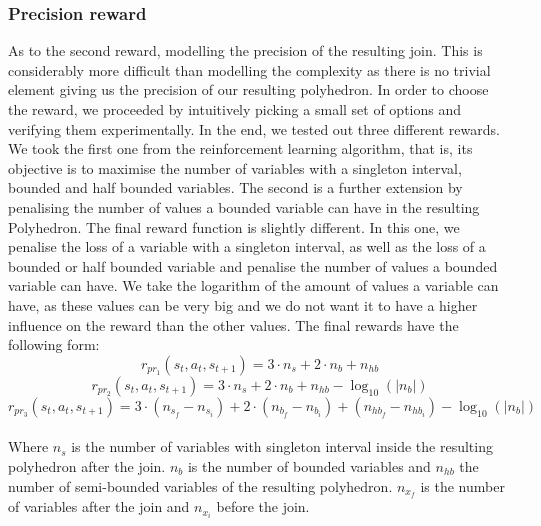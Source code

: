 \subsubsection{Precision reward}
As to the second reward, modelling the precision of the resulting join. This is considerably more difficult than modelling the complexity as there is no trivial element giving us the precision of our resulting polyhedron. In order to choose the reward, we proceeded by intuitively picking a small set of options and verifying them experimentally. In the end, we tested out three different rewards.\\
We took the first one from the reinforcement learning algorithm, that is, its objective is to maximise the number of variables with a singleton interval, bounded and half bounded variables. The second is a further extension by penalising the number of values a bounded variable can have in the resulting Polyhedron. The final reward function is slightly different. In this one, we penalise the loss of a variable with a singleton interval, as well as the loss of a bounded or half bounded variable and penalise the number of values a bounded variable can have. We take the logarithm of the amount of values a variable can have, as these values can be very big and we do not want it to have a higher influence on the reward than the other values. The final rewards have the following form:
\begin{equation}
		r_{pr_1}(s_t,a_t,s_{t+1}) = 3  \cdot n_s + 2 \cdot n_b + n_{hb}
\end{equation}
\begin{equation}
		r_{pr_2}(s_t,a_t,s_{t+1}) = 3  \cdot n_s + 2 \cdot n_b + n_{hb} - \log_{10}(|n_b|)
\end{equation}
\begin{equation}
		r_{pr_3}(s_t,a_t,s_{t+1}) = 3  \cdot (n_{s_f} - n_{s_i}) + 2 \cdot (n_{b_f} - n_{b_i}) + (n_{hb_f} - n_{hb_i}) - \log_{10}(|n_b|)
\end{equation}\mbox{}\\
Where $n_s$ is the number of variables with singleton interval inside the resulting polyhedron after the join. $n_b$ is the number of bounded variables and $n_{hb}$ the number of semi-bounded variables of the resulting polyhedron. $n_{x_f}$ is the number of variables after the join and $n_{x_i}$ before the join.
